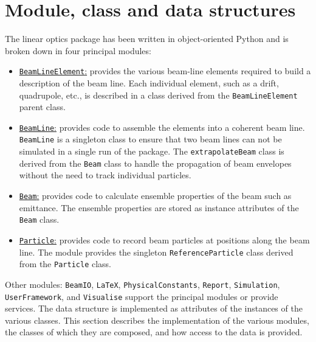 \graphicspath{ {A1-MCD/Figures/} }

\section{Module, class and data structures}

The linear optics package has been written in object-oriented Python
and is broken down in four principal modules:
\begin{itemize}
  \item \underline{\texttt{BeamLineElement}:} provides the various
    beam-line elements required to build a description of the beam
    line.
    Each individual element, such as a drift, quadrupole, etc., is
    described in a class derived from the \texttt{BeamLineElement}
    parent class.
  \item \underline{\texttt{BeamLine}:} provides code to assemble the
    elements into a coherent beam line.
    \texttt{BeamLine} is a singleton class to ensure that two beam
    lines can not be simulated in a single run of the package.
    The \texttt{extrapolateBeam} class is derived from
    the \texttt{Beam} class to handle the propagation of beam
    envelopes without the need to track individual particles.
  \item \underline{\texttt{Beam}:} provides code to calculate
    ensemble properties of the beam such as emittance.
    The ensemble properties are stored as instance attributes of
    the \texttt{Beam} class.
  \item \underline{\texttt{Particle}:} provides code to record beam
    particles at positions along the beam line.
    The module provides the singleton \texttt{ReferenceParticle}
    class derived from the \texttt{Particle} class.
\end{itemize}
Other modules: \texttt{BeamIO}, \texttt{LaTeX},
\texttt{PhysicalConstants}, \texttt{Report}, \texttt{Simulation},
\texttt{UserFramework}, and \texttt{Visualise}
support the principal modules or provide services.
The data structure is implemented as attributes of the instances of the 
various classes.
This section describes the implementation of the various modules, the
classes of which they are composed, and how access to the data is
provided.

